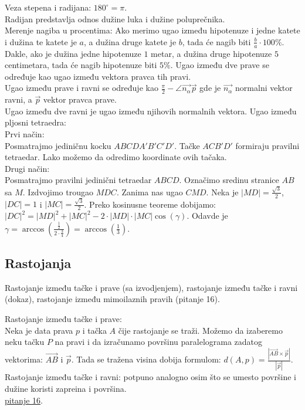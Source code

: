 \documentclass[12pt]{article}
\newcommand{\vek}[1]{\overrightarrow{#1}}
\begin{document}
\vspace*{1cm}

Veza stepena i radijana: $180^\circ=\pi$.\\
Radijan predstavlja odnos dužine luka i dužine poluprečnika.\\
Merenje nagiba u procentima: Ako merimo ugao između hipotenuze
i jedne katete i dužina te katete je $a$, a dužina druge
katete je $b$, tada će nagib biti $\frac{b}{a}\cdot 100\%$. Dakle,
ako je dužina jedne hipotenuze $1$ metar, a dužina druge
hipotenuze $5$ centimetara, tada će nagib hipotenuze biti $5\%$.
Ugao između dve prave se određuje kao ugao između vektora pravca
tih pravi.\\
Ugao između prave i ravni se određuje kao $\frac{\pi}{2}-\angle{\vek{n_\alpha}\vek{p}}$
gde je $\vek{n_\alpha}$ normalni vektor ravni, a $\vek{p}$ vektor pravca prave.\\
Ugao između dve ravni je ugao između njihovih normalnih vektora.
Ugao između pljosni tetraedra:\\
Prvi način:\\
Posmatrajmo jediničnu kocku $ABCDA'B'C'D'$.
Tačke $ACB'D'$ formiraju pravilni tetraedar. Lako možemo
da odredimo koordinate ovih tačaka.\\
Drugi način:\\
Posmatrajmo pravilni jedinični tetraedar $ABCD$. Označimo sredinu
stranice $AB$ sa $M$. Izdvojimo trougao $MDC$. Zanima nas
ugao $CMD$. Neka je $|MD|=\frac{\sqrt{3}}{2}$, $|DC|=1$ i $|MC|=\frac{\sqrt{3}}{2}$.
Preko kosinusne teoreme dobijamo:\\
$|DC|^2=|MD|^2+|MC|^2-2\cdot|MD|\cdot|MC|\cos(\gamma)$.
Odavde je $\gamma=\arccos(\frac{\frac{1}{2}}{2\cdot\frac{3}{4}})=\arccos(\frac{1}{3})$.

\subsection{Rastojanja}
Rastojanje između tačke i prave (sa izvodjenjem),
rastojanje između tačke i ravni (dokaz), rastojanje između
mimoilaznih pravih (pitanje 16).\par

\vspace*{1cm}

Rastojanje između tačke i prave:\\
Neka je data prava $p$ i tačka $A$ čije rastojanje se traži.
Možemo da izaberemo neku tačku $P$ na pravi i da izračunamo
površinu paralelograma zadatog vektorima: $\vek{AB}$ i $\vek{p}$.
Tada se tražena visina dobija formulom: $d(A,p)=\frac{|\vek{AB}\times\vek{p}|}{|\vek{p}|}$.\\
Rastojanje između tačke i ravni: potpuno analogno osim što
se umesto površine i dužine koristi zapreina i površina.\\
\hyperlink{subsec:pitanje_16}{pitanje 16}.
\end{document}
